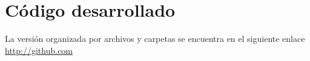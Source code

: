 \chapter{Código desarrollado}

La versión organizada por archivos y carpetas se encuentra en el siguiente enlace \url{http://github.com}